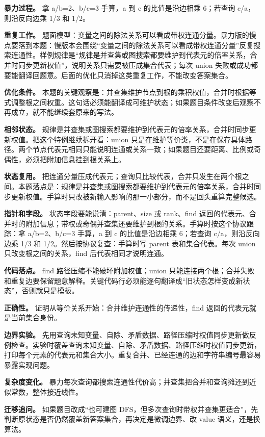 \textbf{暴力过程。} 拿 a/b=2、b/c=3 手算，a 到 c 的比值是沿边相乘 6；若查询 c/a，则沿反向边乘 1/3 和 1/2。

\textbf{重复工作。} 题面模型：变量之间的除法关系可以看成带权连通分量。暴力版的慢点要落到本题：慢版本会围绕“变量之间的除法关系可以看成带权连通分量”反复搜索连通性。样例规律是“规律是并查集或图搜索都要维护到代表元的倍率关系，合并时同步更新权值”，说明关系只需要被压成集合代表；每次 union 失败或成功都要能翻译回题意。后面的优化只消掉这类重复工作，不能改变答案集合。

\textbf{优化条件。} 本题的关键观察是：并查集维护节点到根的乘积权值，合并时根据等式调整根之间权重。这句话必须能翻译成可维护状态；如果题目条件改变后观察不再成立，就不能继续套原来的写法。

\textbf{相邻状态。} 规律是并查集或图搜索都要维护到代表元的倍率关系，合并时同步更新权值。把这个特例继续拆开看：union 只是在维护等价类，不是在保存具体路径。两个节点代表元相同只能说明连通或关系一致；如果题目还要距离、比例或奇偶性，必须把附加信息挂到根关系上。

\textbf{状态复用。} 把连通分量压成代表元；查询只比较代表，合并只发生在两个根之间。本题落点是：规律是并查集或图搜索都要维护到代表元的倍率关系，合并时同步更新权值。手算时只改被新输入影响的那一小部分，而不是回头重算完整候选。

\textbf{指针和字段。} 状态字段要能说清：parent、size 或 rank、find 返回的代表元、合并时的附加信息；带权或奇偶并查集还要维护到根的关系。手算时按这个协议跟踪：拿 a/b=2、b/c=3 手算，a 到 c 的比值是沿边相乘 6；若查询 c/a，则沿反向边乘 1/3 和 1/2。然后按协议复查：手算时写 parent 表和集合代表。每次 union 只改变根之间的关系，find 后代表相同才说明连通。

\textbf{代码落点。} find 路径压缩不能破坏附加权值；union 只能连接两个根；合并失败和重复边要保留题意解释。关键代码行必须能逐句翻译成“旧状态怎样变成新状态”，否则就只是模板。

\textbf{正确性。} 证明从等价关系开始：合并维护连通性的传递性，find 返回的代表元就是当前集合身份。

\textbf{边界实验。} 先用查询未知变量、自除、矛盾数据、路径压缩时权值同步更新做反例检查。实验时覆盖查询未知变量、自除、矛盾数据、路径压缩时权值同步更新，打印每个元素的代表元和集合大小。重复合并、已经连通的边和字符串编号最容易暴露实现问题。

\textbf{复杂度变化。} 暴力每次查询都搜索连通性代价高；并查集把合并和查询摊还到近似常数，整体接近线性。

\textbf{迁移追问。} 如果题目改成“也可建图 DFS，但多次查询时带权并查集更适合”，先判断原状态是否仍然覆盖新答案集合，再决定是微调边界、改 value 语义，还是换算法。

